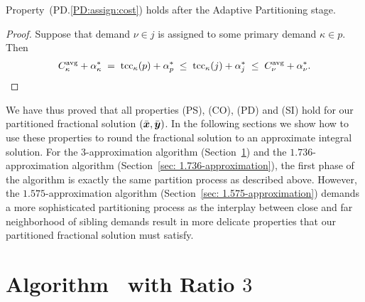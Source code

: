\documentclass[11pt]{article}
\begin{document}

\begin{lemma}\label{lem: PD:assign:cost holds}
Property~(PD.\ref{PD:assign:cost}) holds after the Adaptive Partitioning stage.
\end{lemma}

\begin{proof}
Suppose that demand $\nu\in j$ is assigned to some primary demand $\kappa\in p$.
Then
%
\begin{eqnarray*}
 C^{{\mbox{\scriptsize\rm avg}}}_{\kappa} + \alpha_{\kappa}^\ast \;=\; \textrm{tcc}_\kappa(p) + \alpha^\ast_p
 					\;\le\; \textrm{tcc}_\kappa(j) + \alpha^\ast_j   
					\;\le\; C^{{\mbox{\scriptsize\rm avg}}}_{\nu} + \alpha^\ast_\nu.
\end{eqnarray*}
%
\end{proof}

We have thus proved that all properties (PS), (CO), (PD) and (SI) hold
for our partitioned fractional solution $(\bar{\boldsymbol{x}},\bar{\boldsymbol{y}})$. In the
following sections we show how to use these properties to round the
fractional solution to an approximate integral solution. For the
$3$-approximation algorithm (Section~\ref{sec: 3-approximation}) and
the $1.736$-approximation algorithm (Section~\ref{sec:
  1.736-approximation}), the first phase of the algorithm is exactly
the same partition process as described above. However, the
$1.575$-approximation algorithm (Section~\ref{sec:
  1.575-approximation}) demands a more sophisticated partitioning
process as the interplay between close and far neighborhood of sibling
demands result in more delicate properties that our partitioned
fractional solution must satisfy.


\section{Algorithm~{\EGUP} with Ratio $3$}
\label{sec: 3-approximation}
\end{document}
